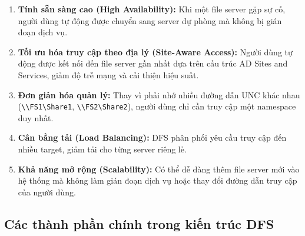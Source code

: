 \begin{enumerate}
    \item \textbf{Tính sẵn sàng cao (High Availability):} Khi một file server gặp sự cố, người dùng tự động được chuyển sang server dự phòng mà không bị gián đoạn dịch vụ.
    
    \item \textbf{Tối ưu hóa truy cập theo địa lý (Site-Aware Access):} Người dùng tự động được kết nối đến file server gần nhất dựa trên cấu trúc AD Sites and Services, giảm độ trễ mạng và cải thiện hiệu suất.
    
    \item \textbf{Đơn giản hóa quản lý:} Thay vì phải nhớ nhiều đường dẫn UNC khác nhau (\texttt{\textbackslash\textbackslash FS1\textbackslash Share1}, \texttt{\textbackslash\textbackslash FS2\textbackslash Share2}), người dùng chỉ cần truy cập một namespace duy nhất.
    
    \item \textbf{Cân bằng tải (Load Balancing):} DFS phân phối yêu cầu truy cập đến nhiều target, giảm tải cho từng server riêng lẻ.
    
    \item \textbf{Khả năng mở rộng (Scalability):} Có thể dễ dàng thêm file server mới vào hệ thống mà không làm gián đoạn dịch vụ hoặc thay đổi đường dẫn truy cập của người dùng.
\end{enumerate}

\subsection{Các thành phần chính trong kiến trúc DFS}

